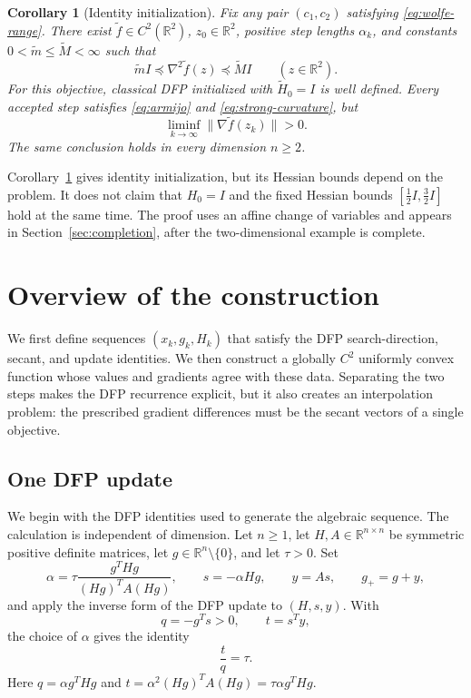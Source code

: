 \documentclass[11pt]{article}
\newtheorem{corollary}[theorem]{Corollary}
\newcommand{\R}{\mathbb R}
\begin{document}
\begin{corollary}[Identity initialization]\label{cor:identity-initialization}
Fix any pair $(c_1,c_2)$ satisfying \eqref{eq:wolfe-range}.  There exist
$\widetilde f\in C^2(\R^2)$, $z_0\in\R^2$, positive step lengths $\alpha_k$,
and constants $0<\widetilde m\le \widetilde M<\infty$ such that
\[
\widetilde m I\preceq\nabla^2\widetilde f(z)
\preceq\widetilde M I\qquad(z\in\R^2).
\]
For this objective, classical DFP initialized with $\widetilde H_0=I$ is well
defined.  Every accepted step satisfies \eqref{eq:armijo} and
\eqref{eq:strong-curvature}, but
\[
\liminf_{k\to\infty}\|\nabla\widetilde f(z_k)\|>0.
\]
The same conclusion holds in every dimension $n\ge2$.
\end{corollary}

Corollary~\ref{cor:identity-initialization} gives identity initialization, but
its Hessian bounds depend on the problem.  It does not claim that $H_0=I$ and
the fixed Hessian bounds $[\frac12 I,\frac32 I]$ hold at the same time.  The
proof uses an affine change of variables and appears in
Section~\ref{sec:completion}, after the two-dimensional example is complete.

\section{Overview of the construction}
\label{sec:strategy}

We first define sequences $(x_k,g_k,H_k)$ that satisfy the DFP
search-direction, secant, and update identities.  We then construct a globally
$C^2$ uniformly convex function whose values and gradients agree with these
data.  Separating the two steps makes the DFP recurrence explicit, but it also
creates an interpolation problem: the prescribed gradient differences must be
the secant vectors of a single objective.

\subsection{One DFP update}

We begin with the DFP identities used to generate the algebraic sequence.  The
calculation is independent of dimension.  Let $n\ge1$, let
$H,A\in\R^{n\times n}$ be symmetric positive definite matrices, let
$g\in\R^n\setminus\{0\}$, and let $\tau>0$.  Set
\begin{equation}\label{eq:abstract-step}
\alpha=\tau\frac{g^THg}{(Hg)^TA(Hg)},\qquad
s=-\alpha Hg,\qquad y=As,\qquad g_+=g+y,
\end{equation}
and apply the inverse form of the DFP update to $(H,s,y)$.  With
\[
q=-g^Ts>0,\qquad t=s^Ty,
\]
the choice of $\alpha$ gives the identity
\begin{equation}\label{eq:line-ratio}
\frac tq=\tau.
\end{equation}
Here $q=\alpha g^THg$ and
$t=\alpha^2(Hg)^TA(Hg)=\tau\alpha g^THg$.
\end{document}
